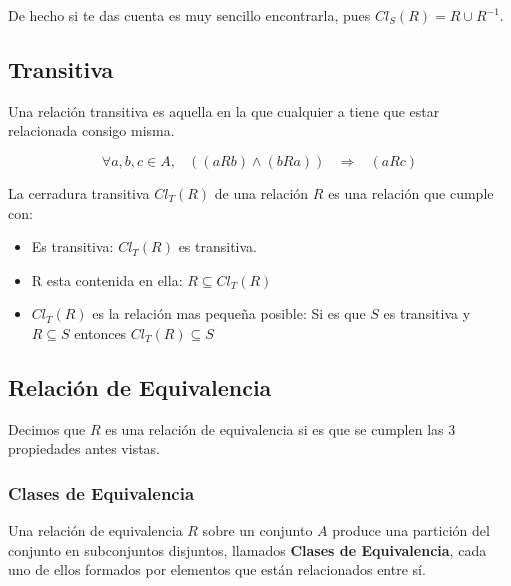 \documentclass[12pt]{report}                                    %
\DeclareMathOperator \Space {\quad}                             %
\DeclareMathOperator \MiniSpace {\;}                            %
\newcommand \lequal {\MiniSpace \Leftrightarrow \MiniSpace}     %
\newcommand \linfire {\MiniSpace \Rightarrow \MiniSpace}        %
\begin{document}
            De hecho si te das cuenta es muy sencillo encontrarla, pues
            $Cl_S(R) = R \cup R^{-1}$.



        \clearpage
        \subsection{Transitiva}

            Una relación transitiva es aquella en la que cualquier a tiene que estar relacionada consigo
            misma.

            \begin{equation}
                \forall a,b,c \in A, \MiniSpace ((aRb) \land (bRa)) \linfire (aRc)
            \end{equation}

            La cerradura transitiva $Cl_T(R)$ de una relación $R$ es una relación que cumple con:

            \begin{itemize}
                \item Es transitiva: $Cl_T(R)$ es transitiva. 
                \item R esta contenida en ella: $R \subseteq Cl_T(R)$
                \item $Cl_T(R)$ es la relación mas pequeña posible: 
                Si es que $S$ es transitiva y $R \subseteq S$ entonces $Cl_T(R) \subseteq S$
            \end{itemize}


        \clearpage
        \subsection{Relación de Equivalencia}
            Decimos que $R$ es una relación de equivalencia si es que se cumplen las 3 propiedades antes vistas.


        \subsubsection{Clases de Equivalencia}

            Una relación de equivalencia $R$ sobre un conjunto $A$ produce una partición
            del conjunto en subconjuntos disjuntos, llamados \textbf{Clases de
            Equivalencia}, cada uno de ellos formados por elementos que están
            relacionados entre sí.
\end{document}
